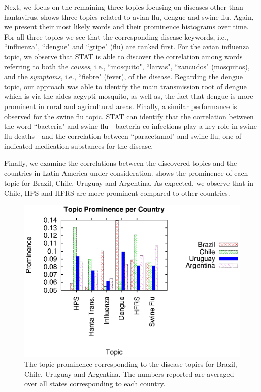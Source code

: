 \documentclass[conference]{IEEEtran}
\newcommand{\model}{{STAT}\xspace} %
\begin{document}
Next, we focus on the remaining three topics focusing on diseases other than hantavirus.  shows three topics related to avian flu, dengue and swine flu. Again, we present their most likely words and their prominence histograms over time. For all three topics we see that the corresponding disease keywords, i.e., ``influenza",  ``dengue" and ``gripe" (flu) are ranked first. For the avian influenza topic, we observe that \model is able to discover the correlation among words referring to both the {\em causes}, i.e., ``mosquito", ``larvas", ``zancudos" (mosquitos), and the {\em symptoms}, i.e., ``fiebre" (fever), of the disease. Regarding the dengue topic, our approach was able to identify the main transmission root of dengue which is via the aides aegypti mosquito, as well as, the fact that dengue is more prominent in rural and agricultural areas. Finally, a similar performance is observed for the swine flu topic. \model can identify that the correlation between the word ``bacteria" and swine flu - bacteria co-infections play a key role in swine flu deaths - and the correlation between ``paracetamol" and swine flu, one of indicated medication substances for the disease.


Finally, we examine the correlations between the discovered topics and the countries in Latin America under consideration.  shows the prominence of each topic for Brazil, Chile, Uruguay and Argentina. As expected, we observe that in Chile, HPS and HFRS are more prominent compared to other countries.

\begin{figure}[h]
\begin{center}
	\includegraphics[trim=5 0 10 5, clip,scale=0.6]{fig/country_topic.eps}
\end{center}
\caption{The topic prominence corresponding to the disease topics for Brazil, Chile, Uruguay and Argentina. The numbers reported are averaged over all states corresponding to each country.}
 \label{fig:country_topic}
\end{figure}
\end{document}
